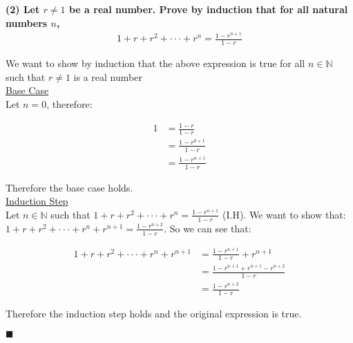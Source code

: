 \documentclass[20pt]{article}
\begin{document}
\noindent
\textbf{(2) Let $r \neq 1$ be a real number. Prove by induction that for all
natural numbers $n$,
}
\begin{align}
    1 + r + r^2 + \cdot \cdot \cdot + r^n = \frac{1 - r^{n + 1}}{1 - r}\nonumber
\end{align}
\begin{text}
    \noindent
    We want to show  by induction that the above expression is true for all $n \in \mathbb{N}$ such that $r \neq 1$ is a real number\\
    
    \noindent
    \underline{Base Case}\\
    Let $n = 0$, therefore:
    
    \begin{align}
        1 &= \frac{1 - r}{1 - r}\nonumber\\
        &= \frac{1 - r^{0 + 1}}{1 - r}\nonumber\\
        &= \frac{1 - r^{n + 1}}{1 - r}\nonumber
    \end{align}
    
    \noindent
    Therefore the base case holds.\\
    
    \noindent
    \underline{Induction Step}\\
    Let $n \in \mathbb{N}$ such that $1 + r + r^2 + \cdot \cdot \cdot + r^n = \frac{1 - r^{n + 1}}{1 - r}$ (I.H). We want to show that: $1 + r + r^2 + \cdot \cdot \cdot + r^n + r^{n+1}= \frac{1 - r^{n + 2}}{1 - r}$. So we can see that:
    
    \begin{align}
        1 + r + r^2 + \cdot \cdot \cdot + r^n + r^{n+1} &= \frac{1 - r^{n + 1}}{1 - r} + r^{n + 1}\nonumber\\
        &= \frac{1 - r^{n + 1} + r^{n + 1} - r^{n + 2}}{1 - r}\nonumber\\
        &= \frac{1 - r^{n + 2}}{1 - r}\nonumber
    \end{align}
    
    \noindent
    Therefore the induction step holds and the original expression is true.
    
    \hfill $\blacksquare$
\end{text}\\
\end{document}
